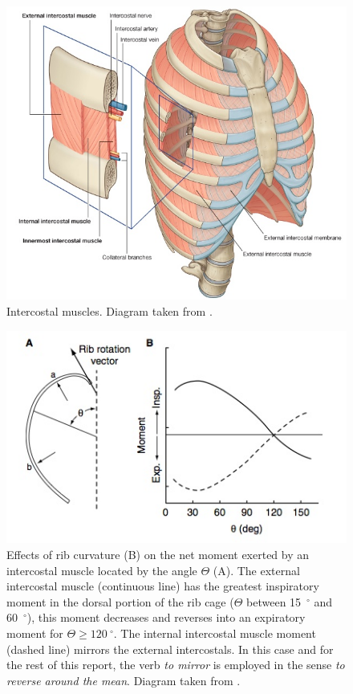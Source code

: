 \begin{figure}
	\centering
	 \includegraphics[scale=0.6]{pics/gray_stud_intercostals.jpg}
	\caption[Intercostal muscles]{\label{fig:gray_stud_intercostals}Intercostal muscles. Diagram taken from \cite{drake2005gray}.}	
\end{figure}

\begin{figure}
	\centering
	 \includegraphics[scale=0.6]{pics/curvature_rib.jpg}
	\caption[Effects of rib curvature on the net moment exerted by an intercostal muscle]{\label{fig:curvature_rib}Effects of rib curvature (B) on the net moment exerted by an intercostal muscle located by the angle $\Theta$ (A). The external intercostal muscle (continuous line) has the greatest inspiratory moment in the dorsal portion of the rib cage ($\Theta$ between 15~$^\circ$ and 60~$^\circ$), this moment decreases and reverses into an expiratory moment for $\Theta \geq 120~^\circ$. The internal intercostal muscle moment (dashed line) mirrors the external intercostals. In this case and for the rest of this report, the verb \emph{to mirror} is employed in the sense \emph{to reverse around the mean}. Diagram taken from \cite{hamid2006phys}.}	
\end{figure}

